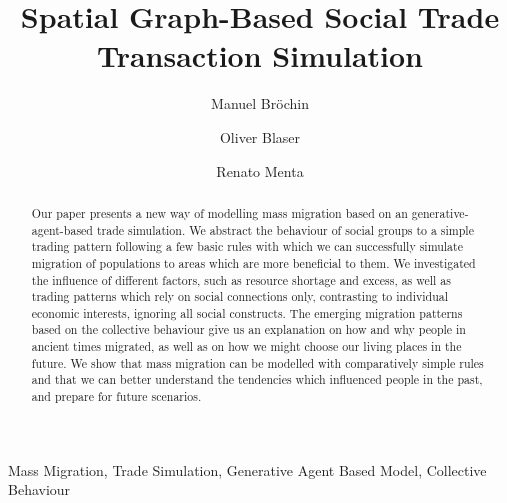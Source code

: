 \documentclass{JASSS}
\title{Spatial Graph-Based Social Trade\\ Transaction Simulation}
\author[1]{Manuel Bröchin}
\affil[1]{Swiss Federal Institute of Technology in Zurich, Rämistr. 101, CH-8092 Zürich, Switzerland}
\author[1]{Oliver Blaser}
\author[1]{Renato Menta}
\begin{document}
\maketitle 



\begin{abstract}
Our paper presents a new way of modelling mass migration based on an generative-agent-based trade simulation. We abstract the behaviour of social groups to a simple trading pattern following a few basic rules with which we can successfully simulate migration of populations to areas which are more beneficial to them. We investigated the influence of different factors, such as resource shortage and excess, as well as trading patterns which rely on social connections only, contrasting to individual economic interests, ignoring all social constructs. The emerging migration patterns based on the collective behaviour give us an explanation on how and why people in ancient times migrated, as well as on how we might choose our living places in the future. We show that mass migration can be modelled with comparatively simple rules and that we can better understand the tendencies which influenced people in the past, and prepare for future scenarios.
\end{abstract}

\begin{keywords}
Mass Migration, Trade Simulation, Generative Agent Based Model, Collective Behaviour
\end{keywords}

\parano{}



\end{document}
